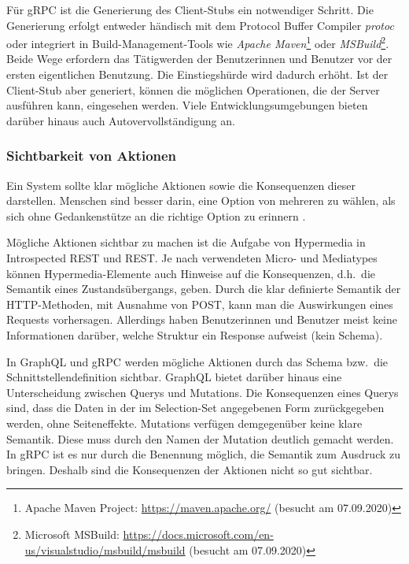 Für gRPC ist die Generierung des Client-Stubs ein notwendiger Schritt. Die Generierung erfolgt entweder händisch mit dem Protocol Buffer Compiler \textit{protoc} oder integriert in Build-Management-Tools wie \textit{Apache Maven}\footnote{Apache Maven Project: \url{https://maven.apache.org/} (besucht am 07.09.2020)} oder \textit{MSBuild}\footnote{Microsoft MSBuild: \url{https://docs.microsoft.com/en-us/visualstudio/msbuild/msbuild} (besucht am 07.09.2020)}. Beide Wege erfordern das Tätigwerden der Benutzerinnen und Benutzer vor der ersten eigentlichen Benutzung. Die Einstiegshürde wird dadurch erhöht. Ist der Client-Stub aber generiert, können die möglichen Operationen, die der Server ausführen kann, eingesehen werden. Viele Entwicklungsumgebungen bieten darüber hinaus auch Autovervollständigung an.


\subsubsection{Sichtbarkeit von Aktionen}
Ein System sollte klar mögliche Aktionen sowie die Konsequenzen dieser darstellen. Menschen sind besser darin, eine Option von mehreren zu wählen, als sich ohne Gedankenstütze an die richtige Option zu erinnern \autocites[S.~178, 250]{Lidwell2010}[S.~129ff.]{Nielsen1994}.

\para{}Mögliche Aktionen sichtbar zu machen ist die Aufgabe von Hypermedia in Introspected REST und REST. Je nach verwendeten Micro- und Mediatypes können Hypermedia-Elemente auch Hinweise auf die Konsequenzen, d.h.\ die Semantik eines Zustandsübergangs, geben. Durch die klar definierte Semantik der HTTP-Methoden, mit Ausnahme von POST, kann man die Auswirkungen eines Requests vorhersagen. Allerdings haben Benutzerinnen und Benutzer meist keine Informationen darüber, welche Struktur ein Response aufweist (kein Schema).

In GraphQL und gRPC werden mögliche Aktionen durch das Schema bzw.\ die Schnittstellendefinition sichtbar. GraphQL bietet darüber hinaus eine Unterscheidung zwischen Querys und Mutations. Die Konsequenzen eines Querys sind, dass die Daten in der im Selection-Set angegebenen Form zurückgegeben werden, ohne Seiteneffekte. Mutations verfügen demgegenüber keine klare Semantik. Diese muss durch den Namen der Mutation deutlich gemacht werden. In gRPC ist es nur durch die Benennung möglich, die Semantik zum Ausdruck zu bringen. Deshalb sind die Konsequenzen der Aktionen nicht so gut sichtbar.

